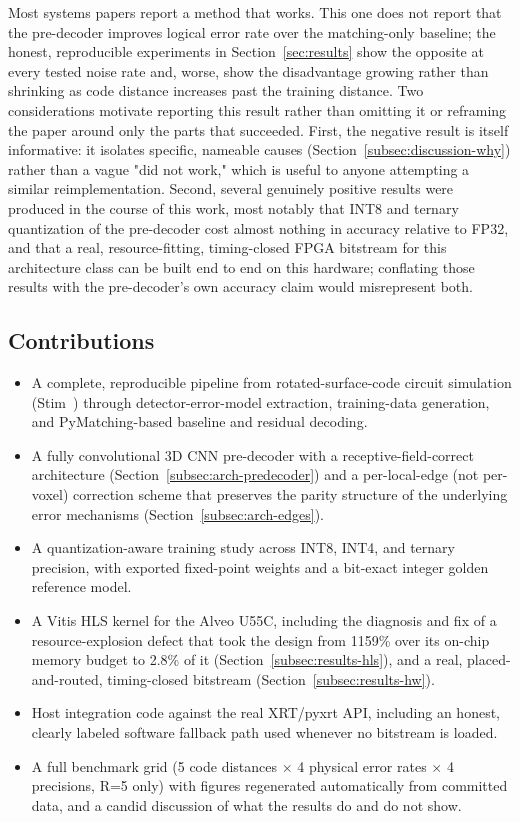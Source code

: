 \documentclass[conference]{IEEEtran}
\begin{document}
Most systems papers report a method that works. This one does not report that the pre-decoder improves logical error rate over the matching-only baseline; the honest, reproducible experiments in Section~\ref{sec:results} show the opposite at every tested noise rate and, worse, show the disadvantage growing rather than shrinking as code distance increases past the training distance. Two considerations motivate reporting this result rather than omitting it or reframing the paper around only the parts that succeeded. First, the negative result is itself informative: it isolates specific, nameable causes (Section~\ref{subsec:discussion-why}) rather than a vague "did not work," which is useful to anyone attempting a similar reimplementation. Second, several genuinely positive results were produced in the course of this work, most notably that INT8 and ternary quantization of the pre-decoder cost almost nothing in accuracy relative to FP32, and that a real, resource-fitting, timing-closed FPGA bitstream for this architecture class can be built end to end on this hardware; conflating those results with the pre-decoder's own accuracy claim would misrepresent both.

\subsection{Contributions}
\label{subsec:contributions}

\begin{itemize}
\item A complete, reproducible pipeline from rotated-surface-code circuit simulation (Stim~\cite{gidney2021stim}) through detector-error-model extraction, training-data generation, and PyMatching-based baseline and residual decoding.
\item A fully convolutional 3D CNN pre-decoder with a receptive-field-correct architecture (Section~\ref{subsec:arch-predecoder}) and a per-local-edge (not per-voxel) correction scheme that preserves the parity structure of the underlying error mechanisms (Section~\ref{subsec:arch-edges}).
\item A quantization-aware training study across INT8, INT4, and ternary precision, with exported fixed-point weights and a bit-exact integer golden reference model.
\item A Vitis HLS kernel for the Alveo U55C, including the diagnosis and fix of a resource-explosion defect that took the design from 1159\% over its on-chip memory budget to 2.8\% of it (Section~\ref{subsec:results-hls}), and a real, placed-and-routed, timing-closed bitstream (Section~\ref{subsec:results-hw}).
\item Host integration code against the real XRT/pyxrt API, including an honest, clearly labeled software fallback path used whenever no bitstream is loaded.
\item A full benchmark grid (5 code distances \(\times\) 4 physical error rates \(\times\) 4 precisions, R=5 only) with figures regenerated automatically from committed data, and a candid discussion of what the results do and do not show.
\end{itemize}
\end{document}
